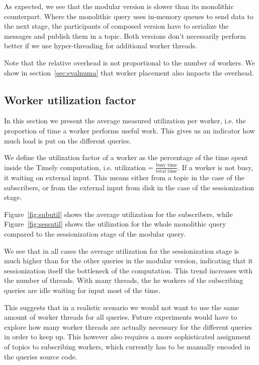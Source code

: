 As expected, we see that the modular version is slower than its monolithic
counterpart. Where the monolithic query uses in-memory queues to send data
to the next stage, the participants of composed version have to serialize
the messages and publish them in a topic. Both versions don't necessarily
perform better if we use hyper-threading for additional worker threads. 

Note that the relative overhead is not proportional to the number of
workers. We show in section~\ref{sec:evalnuma} that worker placement also
impacts the overhead.

\subsection{Worker utilization factor}

In this section we present the average measured utilization per worker, i.e. the proportion
of time a worker performs useful work. This gives us an indicator how much load
is put on the different queries.

We define the utilization factor of a worker as the percentage of
the time spent inside the Timely computation, i.e.
$\text{utilization} = \frac{\text{busy time}}{\text{total time}}$.
If a worker is not busy, it waiting on external input. This means either from a
topic in the case of the subscribers, or from the external input from disk in
the case of the sessionization stage.

Figure~\ref{fig:subutil} shows the average utilization for the subscribers, while
Figure~\ref{fig:sessutil} shows the utilization for the whole monolithic query
compared to the sessionization stage of the modular query. 

We see that in all cases the average utilization for the sessionization stage
is much higher than for the other queries in the modular version, indicating
that it sessionization itself the bottleneck of the computation. This trend
increases with the number of threads. With many threads, the he workers of
the subscribing queries are idle waiting for input most of the time.

This suggests that in a realistic scenario we would not want to use the same
amount of worker threads for all queries. Future experiments would have to
explore how many worker threads are actually necessary for the different queries
in order to keep up. This however also requires a more sophisticated assignment of
topics to subscribing workers, which currently has to be manually encoded in
the queries source code.


